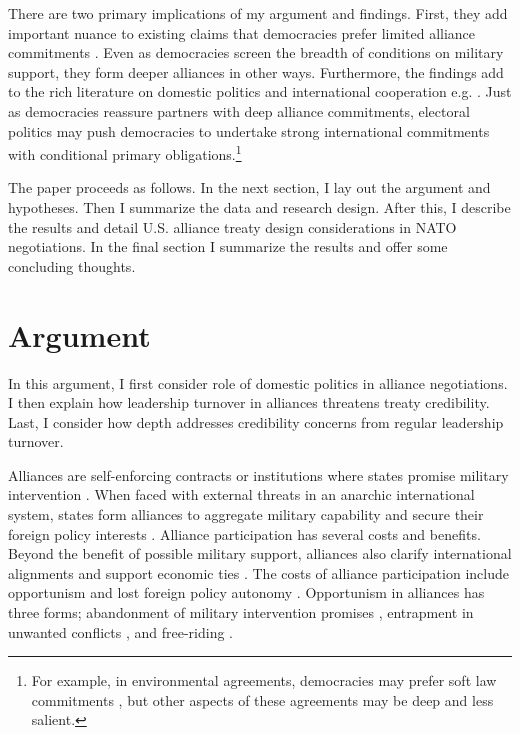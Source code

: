 \documentclass[12pt]{article}
\begin{document}
There are two primary implications of my argument and findings. 
First, they add important nuance to existing claims that democracies prefer limited alliance commitments \citep{Mattes2012, Chibaetal2015, FjelstulReiter2019}. 
Even as democracies screen the breadth of conditions on military support, they form deeper alliances in other ways.
Furthermore, the findings add to the rich literature on domestic politics and international cooperation e.g. \citep{DownesRocke1995, Fearon1998, Leeds1999, MattesRodriguez2014}. 
Just as democracies reassure partners with deep alliance commitments, electoral politics may push democracies to undertake strong international commitments with conditional primary obligations.\footnote{For example, in environmental agreements, democracies may prefer soft law commitments \citep{BoehmeltButkute2018}, but other aspects of these agreements may be deep and less salient.} 


The paper proceeds as follows. 
In the next section, I lay out the argument and hypotheses. 
Then I summarize the data and research design. 
After this, I describe the results and detail U.S. alliance treaty design considerations in NATO negotiations.
In the final section I summarize the results and offer some concluding thoughts. 


\section{Argument}


In this argument, I first consider role of domestic politics in alliance negotiations. 
I then explain how leadership turnover in alliances threatens treaty credibility. 
Last, I consider how depth addresses credibility concerns from regular leadership turnover. 


Alliances are self-enforcing contracts or institutions where states promise military intervention \citep{Leedsetal2002, Morrow2000}. 
When faced with external threats in an anarchic international system, states form alliances to aggregate military capability and secure their foreign policy interests \citep{Altfield1984, Smith1995, Snyder1997, FordhamPoast2014}.
Alliance participation has several costs and benefits.
Beyond the benefit of possible military support, alliances also clarify international alignments \citep{Snyder1990} and support economic ties \citep{Gowa1995, Li2003, Long2003, Fordham2010, WolfordKim2017}.  
The costs of alliance participation include opportunism and lost foreign policy autonomy \citep{Altfield1984, Morrow2000, Johnson2015}. 
Opportunism in alliances has three forms; abandonment of military intervention promises \citep{Leeds2003a, BerkemeierFuhrmann2018}, entrapment in unwanted conflicts \citep{Snyder1984}, and free-riding \citep{Morrow2000}.
\end{document}
